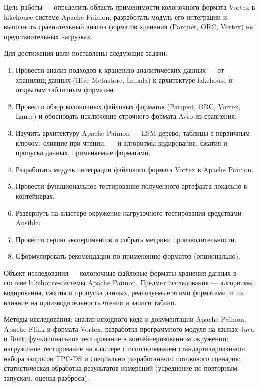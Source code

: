Цель работы --- определить область применимости колоночного формата Vortex
в lakehouse-системе Apache Paimon, разработать модуль его интеграции и выполнить
сравнительный анализ форматов хранения (Parquet, ORC, Vortex) на представительных
нагрузках.

Для достижения цели поставлены следующие задачи.

\begin{enumerate}
    \item Провести анализ подходов к хранению аналитических данных --- от хранилищ
        данных (Hive Metastore, Impala) к архитектуре lakehouse и открытым табличным
        форматам.
    \item Провести обзор колоночных файловых форматов (Parquet, ORC, Vortex, Lance)
        и обосновать исключение строчного формата Avro из сравнения.
    \item Изучить архитектуру Apache Paimon --- LSM-дерево, таблицы с первичным
        ключом, слияние при чтении, --- и алгоритмы кодирования, сжатия и пропуска
        данных, применяемые форматами.
    \item Разработать модуль интеграции файлового формата Vortex в Apache Paimon.
    \item Провести функциональное тестирование полученного артефакта локально в
        контейнерах.
    \item Развернуть на кластере окружение нагрузочного тестирования средствами
        Ansible.
    \item Провести серию экспериментов и собрать метрики производительности.
    \item Сформулировать рекомендации по применению форматов (опционально).
\end{enumerate}

Объект исследования --- колоночные файловые форматы хранения данных в
составе lakehouse-системы Apache Paimon. Предмет исследования --- алгоритмы
кодирования, сжатия и пропуска данных, реализуемые этими форматами, и их влияние на
производительность чтения и записи таблиц.

Методы исследования: анализ исходного кода и документации Apache Paimon,
Apache Flink и формата Vortex; разработка программного модуля на языках Java и Rust;
функциональное тестирование в контейнеризованном окружении; нагрузочное тестирование
на кластере с использованием стандартизированного набора запросов TPC-DS и
специально разработанного потокового сценария; статистическая обработка результатов
измерений (усреднение по повторным запускам, оценка разброса).

